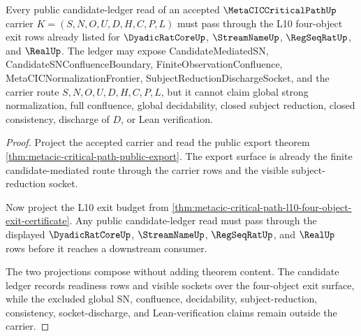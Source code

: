 \begin{theorem}
\label{thm:metacic-critical-path-candidate-ledger-public-boundary}
Every public candidate-ledger read of an accepted $\MetaCICCriticalPathUp$ carrier $K=(S,N,O,U,D,H,C,P,L)$ must pass through the L10 four-object exit rows already listed for $\DyadicRatCoreUp$, $\StreamNameUp$, $\RegSeqRatUp$, and $\RealUp$. The ledger may expose CandidateMediatedSN, CandidateSNConfluenceBoundary, FiniteObservationConfluence, MetaCICNormalizationFrontier, SubjectReductionDischargeSocket, and the carrier route $S,N,O,U,D,H,C,P,L$, but it cannot claim global strong normalization, full confluence, global decidability, closed subject reduction, closed consistency, discharge of $D$, or Lean verification.
\end{theorem}
\begin{proof}
Project the accepted carrier and read the public export theorem \autoref{thm:metacic-critical-path-public-export}. The export surface is already the finite candidate-mediated route through the carrier rows and the visible subject-reduction socket.

Now project the L10 exit budget from \autoref{thm:metacic-critical-path-l10-four-object-exit-certificate}. Any public candidate-ledger read must pass through the displayed $\DyadicRatCoreUp$, $\StreamNameUp$, $\RegSeqRatUp$, and $\RealUp$ rows before it reaches a downstream consumer.

The two projections compose without adding theorem content. The candidate ledger records readiness rows and visible sockets over the four-object exit surface, while the excluded global SN, confluence, decidability, subject-reduction, consistency, socket-discharge, and Lean-verification claims remain outside the carrier.
\end{proof}

